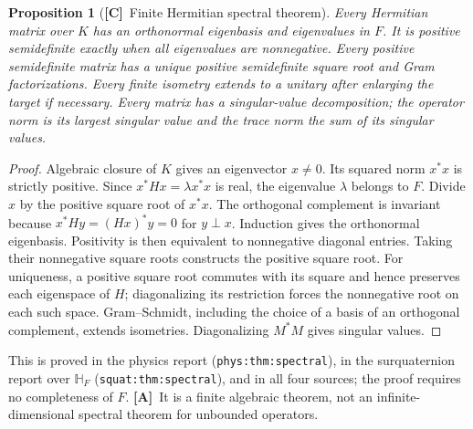 \documentclass[11pt,oneside]{article}
\numberwithin{equation}{section}
\theoremstyle{plain}
\newtheorem{proposition}[proposition]{Proposition}
\theoremstyle{definition}
\theoremstyle{remark}
\newcommand{\HF}{\mathbb H_F}
\newcommand{\TC}{\textcolor{TierC}{\textsf{\bfseries[C]}}}
\newcommand{\TA}{\textcolor{TierA}{\textsf{\bfseries[A]}}}
\begin{document}
\begin{proposition}[\TC\ Finite Hermitian spectral theorem]\label{qgs:prop:spectral}
Every Hermitian matrix over $K$ has an orthonormal eigenbasis and eigenvalues in $F$. It is positive semidefinite exactly when all eigenvalues are nonnegative. Every positive semidefinite matrix has a unique positive semidefinite square root and Gram factorizations. Every finite isometry extends to a unitary after enlarging the target if necessary. Every matrix has a singular-value decomposition; the operator norm is its largest singular value and the trace norm the sum of its singular values.
\end{proposition}
\begin{proof}
Algebraic closure of $K$ gives an eigenvector $x\ne0$. Its squared norm $x^*x$ is strictly positive. Since $x^*Hx=\lambda x^*x$ is real, the eigenvalue $\lambda$ belongs to $F$. Divide $x$ by the positive square root of $x^*x$. The orthogonal complement is invariant because $x^*Hy=(Hx)^*y=0$ for $y\perp x$. Induction gives the orthonormal eigenbasis. Positivity is then equivalent to nonnegative diagonal entries. Taking their nonnegative square roots constructs the positive square root. For uniqueness, a positive square root commutes with its square and hence preserves each eigenspace of $H$; diagonalizing its restriction forces the nonnegative root on each such space. Gram--Schmidt, including the choice of a basis of an orthogonal complement, extends isometries. Diagonalizing $M^*M$ gives singular values.
\end{proof}

This is proved in the physics report (\texttt{phys:thm:spectral}), in the surquaternion report over $\HF$ (\texttt{squat:thm:spectral}), and in all four sources; the proof requires no completeness of $F$. \TA\ It is a finite algebraic theorem, not an infinite-dimensional spectral theorem for unbounded operators.
\end{document}
